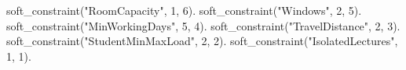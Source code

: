 soft_constraint("RoomCapacity",      1, 6).  soft_constraint("Windows",           2, 5).
soft_constraint("MinWorkingDays",    5, 4).  soft_constraint("TravelDistance",    2, 3).
soft_constraint("StudentMinMaxLoad", 2, 2).  soft_constraint("IsolatedLectures",  1, 1).
